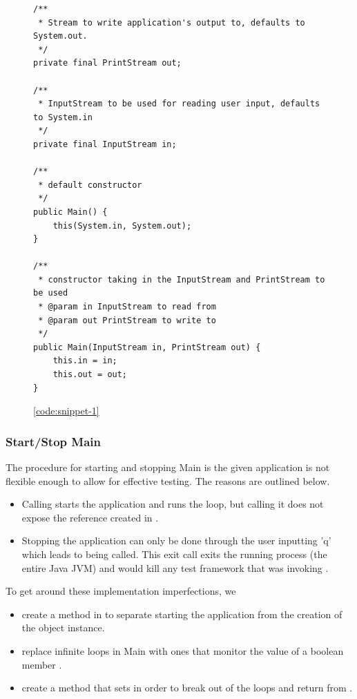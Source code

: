 \par
\begin{figure}
\begin{verbatim}
/**
 * Stream to write application's output to, defaults to System.out.
 */
private final PrintStream out;

/**
 * InputStream to be used for reading user input, defaults to System.in
 */
private final InputStream in;

/**
 * default constructor
 */
public Main() {
    this(System.in, System.out);
}

/**
 * constructor taking in the InputStream and PrintStream to be used
 * @param in InputStream to read from
 * @param out PrintStream to write to
 */
public Main(InputStream in, PrintStream out) {
    this.in = in;
    this.out = out;
}
\end{verbatim}
\ref{code:snippet-1}
\end{figure}

\subsubsection{Start/Stop Main}
\label{sec:start-stop-main}
The procedure for starting and stopping Main is the given application is not flexible enough to allow for effective testing. The reasons are outlined below.
\begin{itemize}
	\item Calling  starts the application and runs the loop, but calling it does not expose the  reference created in . 
	\item Stopping the application can only be done through the user inputting 'q' which leads to  being called. This exit call exits the running process (the entire Java JVM) and would kill any test framework that was invoking .
\end{itemize}

To get around these implementation imperfections, we 
\begin{itemize}
	\item create a method  in  to separate starting the application from the creation of the  object instance. 
	\item replace infinite loops in Main with ones that monitor the value of a boolean member . 
	\item create a method  that sets  in order to break out of the loops and return from .
\end{itemize}

